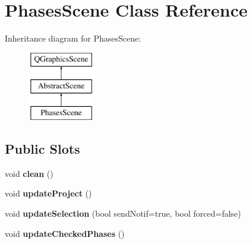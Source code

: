 \hypertarget{class_phases_scene}{\section{Phases\-Scene Class Reference}
\label{class_phases_scene}
}
Inheritance diagram for Phases\-Scene\-:\begin{figure}[H]
\begin{center}
\leavevmode
\includegraphics[height=3.000000cm]{class_phases_scene}
\end{center}
\end{figure}
\subsection*{Public Slots}
\begin{DoxyCompactItemize}
\item 
\hypertarget{class_phases_scene_a8027e749c1340278658295eeb11a9471}{void {\bfseries clean} ()}\label{class_phases_scene_a8027e749c1340278658295eeb11a9471}

\item 
\hypertarget{class_phases_scene_af84b85ee51161f99475a36053c945b69}{void {\bfseries update\-Project} ()}\label{class_phases_scene_af84b85ee51161f99475a36053c945b69}

\item 
\hypertarget{class_phases_scene_a3b9d0ce1645c65de1e69cc6cc39a2eae}{void {\bfseries update\-Selection} (bool send\-Notif=true, bool forced=false)}\label{class_phases_scene_a3b9d0ce1645c65de1e69cc6cc39a2eae}

\item 
\hypertarget{class_phases_scene_a11ed77ac6b3c1dc7f91b3b8f04a33cf8}{void {\bfseries update\-Checked\-Phases} ()}\label{class_phases_scene_a11ed77ac6b3c1dc7f91b3b8f04a33cf8}

\end{DoxyCompactItemize}
